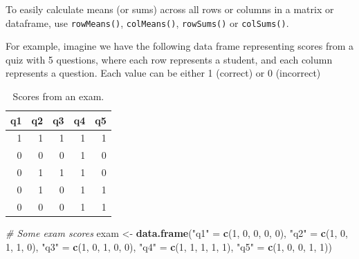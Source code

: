 \documentclass[]{book}
\newenvironment{Shaded}{\begin{snugshade}}{\end{snugshade}}
\newcommand{\KeywordTok}[1]{\textcolor[rgb]{0.13,0.29,0.53}{\textbf{#1}}}
\newcommand{\DecValTok}[1]{\textcolor[rgb]{0.00,0.00,0.81}{#1}}
\newcommand{\StringTok}[1]{\textcolor[rgb]{0.31,0.60,0.02}{#1}}
\newcommand{\CommentTok}[1]{\textcolor[rgb]{0.56,0.35,0.01}{\textit{#1}}}
\newcommand{\NormalTok}[1]{#1}
\theoremstyle{definition}
\theoremstyle{definition}
\theoremstyle{remark}
\begin{document}
To easily calculate means (or sums) across all rows or columns in a
matrix or dataframe, use \texttt{rowMeans()}, \texttt{colMeans()},
\texttt{rowSums()} or \texttt{colSums()}.

For example, imagine we have the following data frame representing
scores from a quiz with 5 questions, where each row represents a
student, and each column represents a question. Each value can be either
1 (correct) or 0 (incorrect)

\begin{table}

\caption{\label{tab:unnamed-chunk-268}Scores from an exam.}
\centering
\begin{tabular}[t]{r|r|r|r|r}
\hline
q1 & q2 & q3 & q4 & q5\\
\hline
1 & 1 & 1 & 1 & 1\\
\hline
0 & 0 & 0 & 1 & 0\\
\hline
0 & 1 & 1 & 1 & 0\\
\hline
0 & 1 & 0 & 1 & 1\\
\hline
0 & 0 & 0 & 1 & 1\\
\hline
\end{tabular}
\end{table}

\begin{Shaded}
\begin{Highlighting}[]
\CommentTok{# Some exam scores}
\NormalTok{exam <-}\StringTok{ }\KeywordTok{data.frame}\NormalTok{(}\StringTok{"q1"}\NormalTok{ =}\StringTok{ }\KeywordTok{c}\NormalTok{(}\DecValTok{1}\NormalTok{, }\DecValTok{0}\NormalTok{, }\DecValTok{0}\NormalTok{, }\DecValTok{0}\NormalTok{, }\DecValTok{0}\NormalTok{),}
                   \StringTok{"q2"}\NormalTok{ =}\StringTok{ }\KeywordTok{c}\NormalTok{(}\DecValTok{1}\NormalTok{, }\DecValTok{0}\NormalTok{, }\DecValTok{1}\NormalTok{, }\DecValTok{1}\NormalTok{, }\DecValTok{0}\NormalTok{),}
                   \StringTok{"q3"}\NormalTok{ =}\StringTok{ }\KeywordTok{c}\NormalTok{(}\DecValTok{1}\NormalTok{, }\DecValTok{0}\NormalTok{, }\DecValTok{1}\NormalTok{, }\DecValTok{0}\NormalTok{, }\DecValTok{0}\NormalTok{),}
                   \StringTok{"q4"}\NormalTok{ =}\StringTok{ }\KeywordTok{c}\NormalTok{(}\DecValTok{1}\NormalTok{, }\DecValTok{1}\NormalTok{, }\DecValTok{1}\NormalTok{, }\DecValTok{1}\NormalTok{, }\DecValTok{1}\NormalTok{),}
                   \StringTok{"q5"}\NormalTok{ =}\StringTok{ }\KeywordTok{c}\NormalTok{(}\DecValTok{1}\NormalTok{, }\DecValTok{0}\NormalTok{, }\DecValTok{0}\NormalTok{, }\DecValTok{1}\NormalTok{, }\DecValTok{1}\NormalTok{))}
\end{Highlighting}
\end{Shaded}
\end{document}
